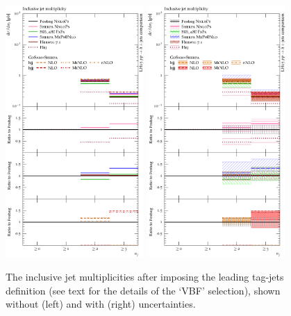 \begin{figure}[t!]
  \centering
  \includegraphics[width=0.47\textwidth]{figures/hjetscomp_u_NJet_incl_30_VBF.pdf}
  \hfill
  \includegraphics[width=0.47\textwidth]{figures/hjetscomp_NJet_incl_30_VBF.pdf}
  \caption{\label{fig:hjetscomp:results:inclobs:njets_VBF}%
    The inclusive jet multiplicities after imposing the leading
    tag-jets definition (see text for the details of the `VBF'
    selection), shown without (left) and with (right) uncertainties.}
\end{figure}

